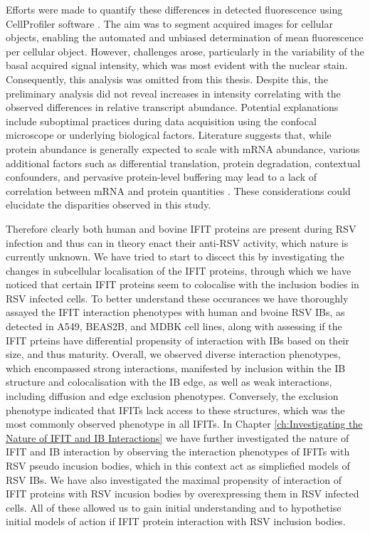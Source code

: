 Efforts were made to quantify these differences in detected fluorescence using CellProfiler software \cite{McQuin2018CellProfilerBiology}. The aim was to segment acquired images for cellular objects, enabling the automated and unbiased determination of mean fluorescence per cellular object. However, challenges arose, particularly in the variability of the basal acquired signal intensity, which was most evident with the nuclear stain. Consequently, this analysis was omitted from this thesis. Despite this, the preliminary analysis did not reveal increases in intensity correlating with the observed differences in relative transcript abundance. Potential explanations include suboptimal practices during data acquisition using the confocal microscope or underlying biological factors. Literature suggests that, while protein abundance is generally expected to scale with mRNA abundance, various additional factors such as differential translation, protein degradation, contextual confounders, and pervasive protein-level buffering may lead to a lack of correlation between mRNA and protein quantities \cite{Liu2016OnAbundance, Buccitelli2020MRNAsControl}. These considerations could elucidate the disparities observed in this study.

Therefore clearly both human and bovine IFIT proteins are present during RSV infection and thus can in theory enact their anti-RSV activity, which nature is currently unknown. We have tried to start to discect this by investigating the changes in subcellular localisation of the IFIT proteins, through which we have noticed that certain IFIT proteins seem to colocalise with the inclusion bodies in RSV infected cells. To better understand these occurances we have thoroughly assayed the IFIT interaction phenotypes with human and bvoine RSV IBs, as detected in A549, BEAS2B, and MDBK cell lines, along with assessing if the IFIT prteins have differential propensity of interaction with IBs based on their size, and thus maturity. Overall, we observed diverse interaction phenotypes, which encompassed strong interactions, manifested by inclusion within the IB structure and colocalisation with the IB edge, as well as weak interactions, including diffusion and edge exclusion phenotypes. Conversely, the exclusion phenotype indicated that IFITs lack access to these structures, which was the most commonly observed phenotype in all IFITs. In Chapter \ref{ch:Investigating the Nature of IFIT and IB Interactions} we have further investigated the nature of IFIT and IB interaction by observing the interaction phenotypes of IFITs with RSV pseudo incusion bodies, which in this context act as simpliefied models of RSV IBs. We have also investigated the maximal propensity of interaction of IFIT proteins with RSV incusion bodies by overexpressing them in RSV infected cells. All of these allowed us to gain initial understanding and to hypothetise initial models of action if IFIT protein interaction with RSV inclusion bodies. 

